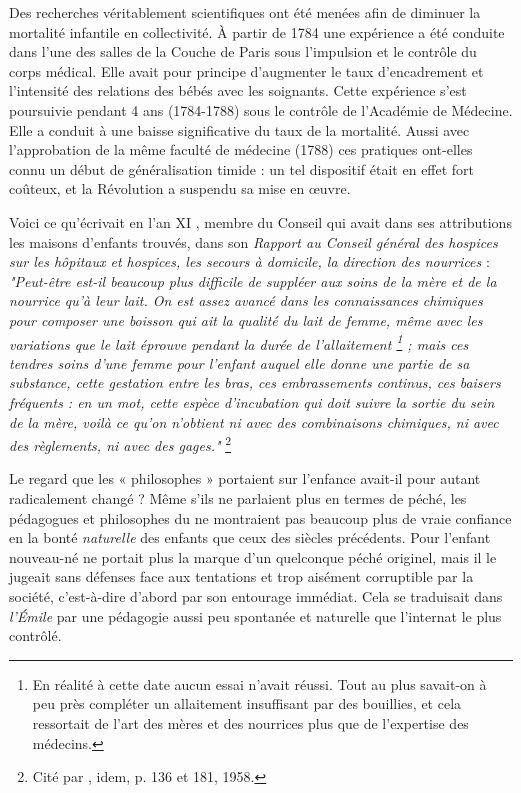  Des recherches véritablement scientifiques ont été menées afin de diminuer la mortalité infantile en collectivité. À partir de 1784 une expérience a été conduite dans l'une des salles de la Couche de Paris sous l'impulsion et le contrôle du corps médical. Elle avait pour principe d'augmenter le taux d'encadrement et l'intensité des relations des bébés avec les soignants. Cette expérience s'est poursuivie pendant 4 ans (1784-1788) sous le contrôle de l'Académie de Médecine. Elle a conduit à une baisse significative du taux de la mortalité. Aussi avec l'approbation de la même faculté de médecine (1788) ces pratiques ont-elles connu un début de généralisation timide : un tel dispositif était en effet fort coûteux, et la Révolution a suspendu sa mise en œuvre.

 Voici ce qu'écrivait en l'an XI , membre du Conseil qui avait dans ses attributions les maisons d'enfants trouvés, dans son \emph{Rapport au Conseil général des hospices sur les hôpitaux et hospices, les secours à domicile, la direction des nourrices} : \emph{"Peut-être est-il beaucoup plus difficile de suppléer aux soins de la mère et de la nourrice qu'à leur lait. On est assez avancé dans les connaissances chimiques pour composer une boisson qui ait la qualité du lait de femme, même avec les variations que le lait éprouve pendant la durée de l'allaitement%
\footnote{En réalité à cette date aucun essai n'avait réussi. Tout au plus savait-on à peu près compléter un allaitement insuffisant par des bouillies, et cela ressortait de l'art des mères et des nourrices plus que de l'expertise des médecins.} 
; mais ces tendres soins d'une femme pour l'enfant auquel elle donne une partie de sa substance, cette gestation entre les bras, ces embrassements continus, ces baisers fréquents : en un mot, cette espèce d'incubation qui doit suivre la sortie du sein de la mère, voilà ce qu'on n'obtient ni avec des combinaisons chimiques, ni avec des règlements, ni avec des gages."}%
\footnote{Cité par , idem, p. 136 et 181, 1958.} 

Le regard que les « {philosophes} » portaient sur l'enfance avait-il pour autant radicalement changé ? Même s'ils ne parlaient plus en termes de péché, les pédagogues et philosophes du  ne montraient pas beaucoup plus de vraie confiance en la bonté \emph{naturelle} des enfants que ceux des siècles précédents. Pour  l'enfant nouveau-né ne portait plus la marque d'un quelconque péché originel, mais il le jugeait sans défenses face aux tentations et trop aisément corruptible par la société, c'est-à-dire d'abord par son entourage immédiat. Cela se traduisait dans \emph{l'Émile} par une pédagogie aussi peu spontanée et naturelle que l'internat le plus contrôlé. 
 
